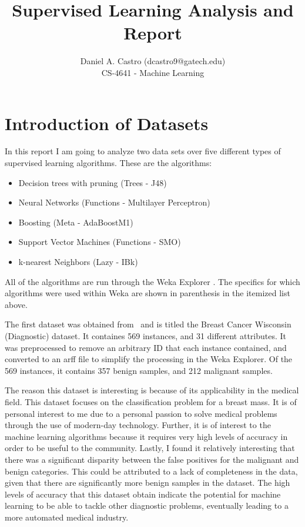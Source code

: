 \documentclass[annual]{acmsiggraph}
\title{Supervised Learning Analysis and Report}
\author{Daniel A. Castro (dcastro9@gatech.edu) \\ CS-4641 - Machine Learning}
\begin{document}
\maketitle

\section{Introduction of Datasets}

	In this report I am going to analyze two data sets over five different
types of supervised learning algorithms. These are the algorithms:
\begin{itemize}
\item Decision trees with pruning (Trees - J48)
\item Neural Networks (Functions - Multilayer Perceptron)
\item Boosting (Meta - AdaBoostM1)
\item Support Vector Machines (Functions - SMO)
\item k-nearest Neighbors (Lazy - IBk)
\end{itemize}

All of the algorithms are run through the Weka Explorer \cite{Hall_weka:2010}. The 
specifics for which algorithms were used within Weka are shown in parenthesis in 
the itemized list above.

The first dataset was obtained from~\cite{Frank+Asuncion:2010} and is titled the
Breast Cancer Wisconsin (Diagnostic) dataset. It containes 569 instances, and 31
different attributes. It was preprocessed to remove an arbitrary ID that each
instance contained, and converted to an arff file to simplify the processing in
the Weka Explorer. Of the 569 instances, it contains 357 benign samples, and 212
malignant samples.

The reason this dataset is interesting is because of its applicability in the
medical field. This dataset focuses on the classification problem for a breast
mass. It is of personal interest to me due to a personal passion to solve medical
problems through the use of modern-day technology. Further, it is of interest to
the machine learning algorithms because it requires very high levels of accuracy
in order to be useful to the community. Lastly, I found it relatively interesting
that there was a significant disparity between the false positives for the malignant
and benign categories. This could be attributed to a lack of completeness in the
data, given that there are significantly more benign samples in the dataset. The
high levels of accuracy that this dataset obtain indicate the potential for machine
learning to be able to tackle other diagnostic problems, eventually leading to a
more automated medical industry.
\end{document}
